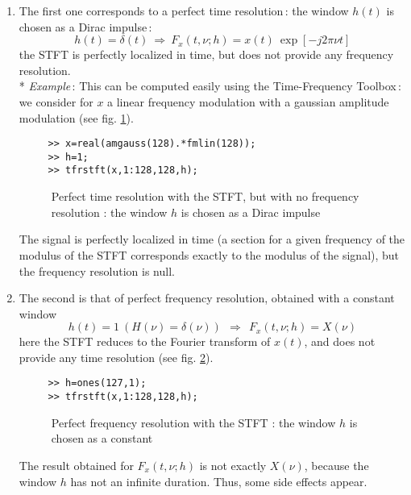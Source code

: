 \begin{enumerate}
\item The first one corresponds to a perfect time resolution\,: the window
$h(t)$ is chosen as a Dirac impulse\,:
\[h(t)=\delta(t) \ \Rightarrow\  F_x(t,\nu;h)=x(t)\ \exp{[-j2\pi \nu t]}\]   
the STFT is perfectly localized in time, but does not provide any frequency
resolution.\\

  * {\it Example}\,: This can be computed easily using the Time-Frequency
Toolbox\,: we consider for $x$ a linear frequency modulation with a gaussian
amplitude modulation (see fig. \ref{At1fig5}).
\begin{verbatim}
     >> x=real(amgauss(128).*fmlin(128));
     >> h=1;
     >> tfrstft(x,1:128,128,h);
\end{verbatim}
\begin{figure}[htb]
\epsfxsize=10cm
\epsfysize=8cm
\centerline{}
\caption{\label{At1fig5}Perfect time resolution with the STFT, but with no
frequency resolution : the window $h$ is chosen as a Dirac impulse}
\end{figure}
The signal is perfectly localized in time (a section for a given frequency
of the modulus of the STFT corresponds exactly to the modulus of the
signal), but the frequency resolution is null.

\item The second is that of perfect frequency resolution, obtained with a
constant window
\[h(t)=1\ (H(\nu)=\delta(\nu))\ \ \Rightarrow\ \ F_x(t,\nu;h)=X(\nu)\]
here the STFT reduces to the Fourier transform of $x(t)$, and does not
provide any time resolution (see fig. \ref{At1fig6}).
\begin{verbatim}
     >> h=ones(127,1);
     >> tfrstft(x,1:128,128,h);
\end{verbatim}
\begin{figure}[htb]
\epsfxsize=10cm
\epsfysize=8cm
\centerline{}
\caption{\label{At1fig6}Perfect frequency resolution with the STFT : the window
$h$ is chosen as a constant}
\end{figure}
The result obtained for $F_x(t,\nu;h)$ is not exactly $X(\nu)$, because the
window $h$ has not an infinite duration. Thus, some side effects appear.
\end{enumerate}

